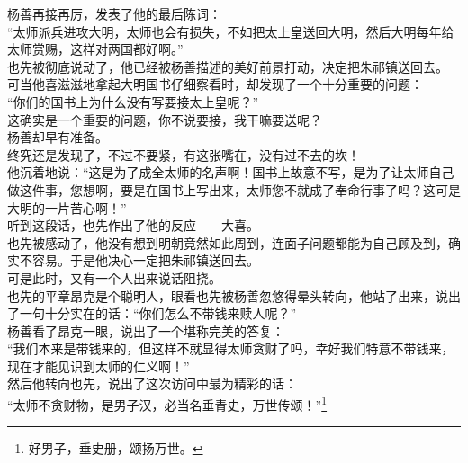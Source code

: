 \begin{multicols}{\theparacolNo}
杨善再接再厉，发表了他的最后陈词：\\

“太师派兵进攻大明，太师也会有损失，不如把太上皇送回大明，然后大明每年给太师赏赐，这样对两国都好啊。”\\

也先被彻底说动了，他已经被杨善描述的美好前景打动，决定把朱祁镇送回去。\\

可当他喜滋滋地拿起大明国书仔细察看时，却发现了一个十分重要的问题：\\

“你们的国书上为什么没有写要接太上皇呢？”\\

这确实是一个重要的问题，你不说要接，我干嘛要送呢？\\

杨善却早有准备。\\

终究还是发现了，不过不要紧，有这张嘴在，没有过不去的坎！\\

他沉着地说：“这是为了成全太师的名声啊！国书上故意不写，是为了让太师自己做这件事，您想啊，要是在国书上写出来，太师您不就成了奉命行事了吗？这可是大明的一片苦心啊！”\\

听到这段话，也先作出了他的反应——大喜。\\

也先被感动了，他没有想到明朝竟然如此周到，连面子问题都能为自己顾及到，确实不容易。于是他决心一定把朱祁镇送回去。\\

可是此时，又有一个人出来说话阻挠。\\

也先的平章昂克是个聪明人，眼看也先被杨善忽悠得晕头转向，他站了出来，说出了一句十分实在的话：“你们怎么不带钱来赎人呢？”\\

杨善看了昂克一眼，说出了一个堪称完美的答复：\\

“我们本来是带钱来的，但这样不就显得太师贪财了吗，幸好我们特意不带钱来，现在才能见识到太师的仁义啊！”\\

然后他转向也先，说出了这次访问中最为精彩的话：\\

“太师不贪财物，是男子汉，必当名垂青史，万世传颂！”\footnote{好男子，垂史册，颂扬万世。}\\


\end{multicols}
